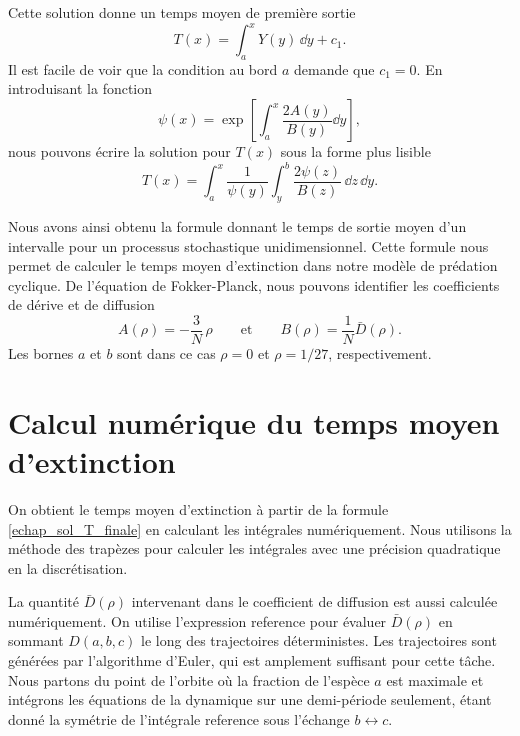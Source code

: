 \documentclass[openany,a4paper,12pt]{article}
\begin{document}
%
Cette solution donne un temps moyen de première sortie
%
\begin{equation}\label{echap_sol_T_avec_c1}
	T(x) = \int_a^x Y(y) \, \dd y + c_1.
\end{equation}
%
Il est facile de voir que la condition au bord $a$ demande que $c_1=0$. En introduisant la fonction   
%
\begin{equation}\label{echap_psi_x}
	\psi(x) = \exp\left[ \int_a^x \frac{2A(y)}{B(y)} \dd y \right] ,
\end{equation}
%
nous pouvons écrire la solution pour $T(x)$ sous la forme plus lisible
%
\begin{equation}\label{echap_sol_T_finale}
	T(x) = \int_a^x \frac{1}{\psi(y)} \int_y^b \frac{2\psi(z)}{B(z)} \, \dd z \, \dd y.
\end{equation}
%

\par Nous avons ainsi obtenu la formule donnant le temps de sortie moyen d'un intervalle pour un processus stochastique unidimensionnel. Cette formule nous permet de calculer le temps moyen d'extinction dans notre modèle de prédation cyclique. De l'équation de Fokker-Planck, nous pouvons identifier les coefficients de dérive et de diffusion
%
\begin{equation}\label{coefs_A_B_radial}
A(\rho) = - \frac 3N \, \rho \qquad \text{et} \qquad 
B(\rho) = \frac 1N \bar D(\rho).
\end{equation}
%
Les bornes $a$ et $b$ sont dans ce cas $\rho=0$ et $\rho=1/27$, respectivement.


\section{Calcul numérique du temps moyen d'extinction}

\par On obtient le temps moyen d'extinction à partir de la formule \ref{echap_sol_T_finale} en calculant les intégrales numériquement. Nous utilisons la méthode des trapèzes pour calculer les intégrales avec une précision quadratique en la discrétisation.

\par La quantité $\bar D(\rho)$ intervenant dans le coefficient de diffusion est aussi calculée numériquement. On utilise l'expression {\color{red} reference} pour évaluer $\bar D(\rho)$ en sommant $D(a,b,c)$ le long des trajectoires déterministes. Les trajectoires sont générées par l'algorithme d'Euler, qui est amplement suffisant pour cette tâche. Nous partons du point de l'orbite où la fraction de l'espèce $a$ est maximale et intégrons les équations de la dynamique sur une demi-période seulement, étant donné la symétrie de l'intégrale {\color{red} reference} sous l'échange $b\leftrightarrow c$.
\end{document}
